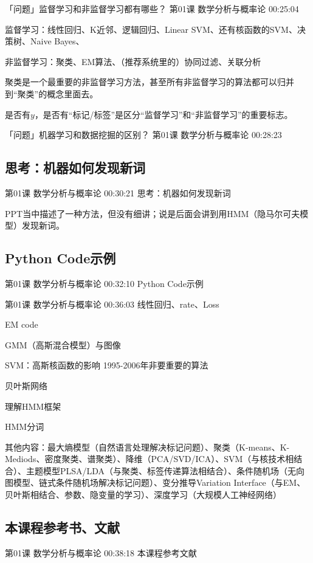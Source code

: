 \documentclass[UTF8]{ctexart}
\begin{document}
「问题」监督学习和非监督学习都有哪些？ 第01课 数学分析与概率论 00:25:04

监督学习：线性回归、K近邻、逻辑回归、Linear SVM、还有核函数的SVM、决策树、Naive Bayes、

非监督学习：聚类、EM算法、（推荐系统里的）协同过滤、关联分析

聚类是一个最重要的非监督学习方法，甚至所有非监督学习的算法都可以归并到“聚类”的概念里面去。

是否有$y$，是否有“标记/标签”是区分“监督学习”和“非监督学习”的重要标志。

「问题」机器学习和数据挖掘的区别？ 第01课 数学分析与概率论 00:28:23


\subsection{思考：机器如何发现新词}

第01课 数学分析与概率论 00:30:21 思考：机器如何发现新词

PPT当中描述了一种方法，但没有细讲；说是后面会讲到用HMM（隐马尔可夫模型）发现新词。

\subsection{Python Code示例}

第01课 数学分析与概率论 00:32:10 Python Code示例

第01课 数学分析与概率论 00:36:03 线性回归、rate、Loss

EM code

GMM（高斯混合模型）与图像

SVM：高斯核函数的影响        1995-2006年非要重要的算法

贝叶斯网络

理解HMM框架

HMM分词

其他内容：最大熵模型（自然语言处理解决标记问题）、聚类（K-means、K-Mediods、密度聚类、谱聚类）、降维（PCA/SVD/ICA）、SVM（与核技术相结合）、主题模型PLSA/LDA（与聚类、标签传递算法相结合）、条件随机场（无向图模型、链式条件随机场解决标记问题）、变分推导Variation Interface（与EM、贝叶斯相结合、参数、隐变量的学习）、深度学习（大规模人工神经网络）

\subsection{本课程参考书、文献}

第01课 数学分析与概率论 00:38:18 本课程参考文献
\end{document}
